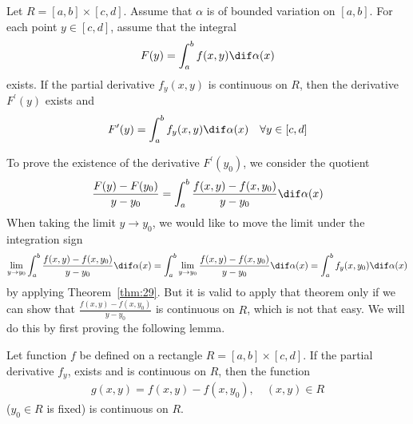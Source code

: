 \documentclass[thmcnt=section, color=blue, 12pt]{my-elegantbook}
\begin{document}
\begin{theorem} \label{thm:30}
	Let $R = [a, b] \times [c, d]$.
	Assume that $\alpha$ is of bounded variation on $[a, b]$.
	For each point $y \in [c, d]$, assume that the integral
	\begin{align*}
		F(y) = \int_a^b f(x, y) \dif \alpha(x)
	\end{align*}
	exists.
	If the partial derivative $f_y(x, y)$ is continuous on $R$,
	then the derivative $F^\prime(y)$ exists and
	\begin{align*}
		F^\prime(y) = \int_a^b f_y(x, y) \dif \alpha(x)
		\quad \forall y \in [c, d]
	\end{align*}
\end{theorem}

To prove the existence of the derivative $F^\prime(y_0)$,
we consider the quotient
\begin{align*}
	\frac{F(y) - F(y_0)}{y - y_0}
	= \int_a^b \frac{f(x, y) - f(x, y_0)}{y - y_0} \dif \alpha(x)
\end{align*}
When taking the limit $y \to y_0$, we would like to move the
limit under the integration sign
\begin{align*}
	\lim_{y \to y_0} \int_a^b \frac{f(x, y) - f(x, y_0)}{y - y_0} \dif \alpha(x)
	= \int_a^b \lim_{y \to y_0} \frac{f(x, y) - f(x, y_0)}{y - y_0} \dif \alpha(x)
	=  \int_a^b f_y(x, y_0) \dif \alpha(x)
\end{align*}
by applying Theorem~\ref{thm:29}.
But it is valid to apply that theorem only if
we can show that $\frac{f(x, y) - f(x, y_0)}{y - y_0}$ is continuous on $R$,
which is not that easy.
We will do this by first proving the following lemma.


\begin{lemma} \label{lem:2}
	Let function $f$ be defined on a rectangle $R = [a, b] \times [c, d]$.
	If the partial derivative $f_y$, exists
	and is continuous on $R$,
	then the function
	\begin{align*}
		g(x, y) = f(x, y) - f(x, y_0), \quad (x, y) \in R
	\end{align*}
	($y_0 \in R$ is fixed) is continuous on $R$.
\end{lemma}
\end{document}
